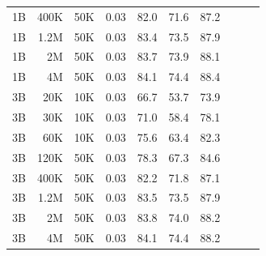 \begin{table}[h]
\begin{tabulary}{1.0\textwidth}{l r c c c c c c c c}
1B    & 400K  & 50K   & 0.03 & 82.0 & 71.6 & 87.2 \\
1B    & 1.2M  & 50K   & 0.03 & 83.4 & 73.5 & 87.9 \\
1B    & 2M    & 50K   & 0.03 & 83.7 & 73.9 & 88.1 \\
1B    & 4M    & 50K   & 0.03 & 84.1 & 74.4 & 88.4 \\
\midrule[0.25pt]
3B    & 20K   & 10K   & 0.03 & 66.7 & 53.7 & 73.9 \\
3B    & 30K   & 10K   & 0.03 & 71.0 & 58.4 & 78.1 \\
3B    & 60K   & 10K   & 0.03 & 75.6 & 63.4 & 82.3 \\
3B    & 120K  & 50K   & 0.03 & 78.3 & 67.3 & 84.6 \\
3B    & 400K  & 50K   & 0.03 & 82.2 & 71.8 & 87.1 \\
3B    & 1.2M  & 50K   & 0.03 & 83.5 & 73.5 & 87.9 \\
3B    & 2M    & 50K   & 0.03 & 83.8 & 74.0 & 88.2 \\
3B    & 4M    & 50K   & 0.03 & 84.1 & 74.4 & 88.2 \\
    \bottomrule
  \end{tabulary}
\end{table}

